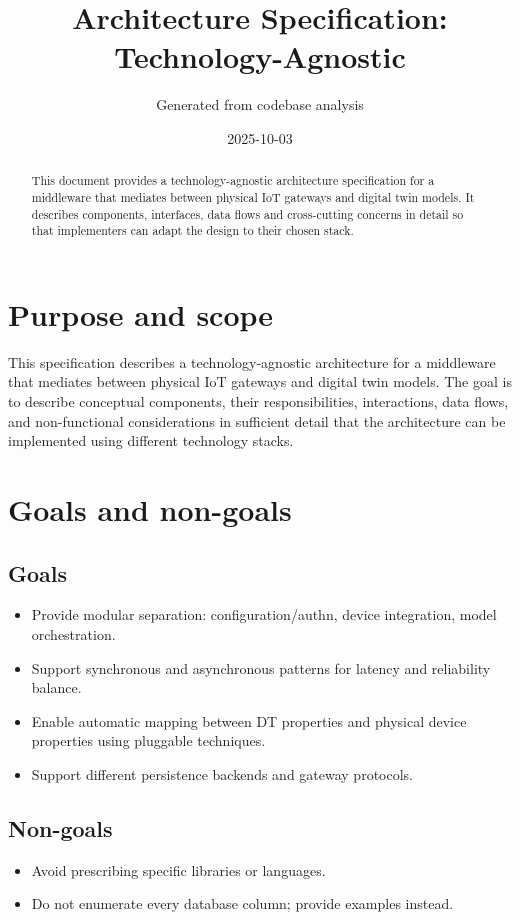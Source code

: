 \documentclass[11pt,a4paper]{article}
\title{Architecture Specification: Technology-Agnostic}
\author{Generated from codebase analysis}
\date{2025-10-03}
\begin{document}
\maketitle
\begin{abstract}
This document provides a technology-agnostic architecture specification for a middleware that mediates between physical IoT gateways and digital twin models. It describes components, interfaces, data flows and cross-cutting concerns in detail so that implementers can adapt the design to their chosen stack.
\end{abstract}

\section{Purpose and scope}
This specification describes a technology-agnostic architecture for a middleware that mediates between physical IoT gateways and digital twin models. The goal is to describe conceptual components, their responsibilities, interactions, data flows, and non-functional considerations in sufficient detail that the architecture can be implemented using different technology stacks.

\section{Goals and non-goals}
\subsection{Goals}
\begin{itemize}
  \item Provide modular separation: configuration/authn, device integration, model orchestration.
  \item Support synchronous and asynchronous patterns for latency and reliability balance.
  \item Enable automatic mapping between DT properties and physical device properties using pluggable techniques.
  \item Support different persistence backends and gateway protocols.
\end{itemize}

\subsection{Non-goals}
\begin{itemize}
  \item Avoid prescribing specific libraries or languages.
  \item Do not enumerate every database column; provide examples instead.
\end{itemize}
\end{document}
